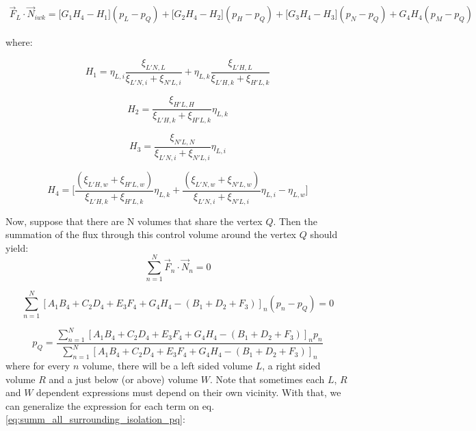\documentclass{article}
\begin{document}
\begin{equation} \label{eq:flux_L_coefficients}
\begin{split}
\vec{F}_{L} \cdot \vec{N}_{iwk} = \Bigg[G_{1}H_{4}-H_{1}\Bigg] (p_{L}-p_{Q})+ \Bigg[G_{2}H_{4}-H_{2}\Bigg](p_{H} - p_{Q})+\Bigg[G_{3}H_{4}-H_{3}\Bigg](p_{N} - p_{Q})+G_{4}H_{4}(p_{M} - p_{Q})
\end{split}
\end{equation}

where:

\begin{displaymath}
H_{1} = \eta_{L,i}\frac{\xi_{L'N,L}}{\xi_{L'N,i}+\xi_{N'L,i}}+\eta_{L,k}\frac{\xi_{L'H,L}}{\xi_{L'H,k}+\xi_{H'L,k}}
\end{displaymath}

\begin{displaymath}
H_{2} = \frac{\xi_{H'L,H}}{\xi_{L'H,k}+\xi_{H'L,k}}\eta_{L,k}
\end{displaymath}

\begin{displaymath}
H_{3} = \frac{\xi_{N'L,N}}{\xi_{L'N,i}+\xi_{N'L,i}}\eta_{L,i}
\end{displaymath}

\begin{displaymath}
H_{4} = \Bigg[\frac{ (\xi_{L'H,w}+\xi_{H'L,w})}{\xi_{L'H,k}+\xi_{H'L,k}}\eta_{L,k}
 +\frac{(\xi_{L'N,w}+\xi_{N'L,w})}{\xi_{L'N,i}+\xi_{N'L,i}}\eta_{L,i} - \eta_{L,w}\Bigg]
\end{displaymath}

Now, suppose that there are N volumes that share the vertex $ Q $. Then the summation of the flux through this control volume around the vertex $ Q $ should yield:
\begin{equation} \label{eq:summ_all_surrounding_Q}
\sum_{n = 1}^{N}\vec{F}_{n} \cdot \vec{N}_{n}=0
\end{equation}

\begin{equation} \label{eq:summ_all_surrounding_Q_coeffic}
\sum_{n=1}^{N}[A_{1}B_{4}+C_{2}D_{4}+E_{3}F_{4}+G_{4}H_{4}-(B_{1}+D_{2}+F_{3})]_{n}(p_{n}-p_{Q})=0
\end{equation}

\begin{equation} \label{eq:summ_all_surrounding_isolation_pq}
p_{Q}=\frac{\sum_{n=1}^{N}[A_{1}B_{4}+C_{2}D_{4}+E_{3}F_{4}+G_{4}H_{4}-(B_{1}+D_{2}+F_{3})]_{n}p_{n}}{\sum_{n=1}^{N}[A_{1}B_{4}+C_{2}D_{4}+E_{3}F_{4}+G_{4}H_{4}-(B_{1}+D_{2}+F_{3})]_{n}}
\end{equation}
where for every $ n $ volume, there will be a left sided volume $ L $, a right sided volume $ R $ and a just below (or above) volume $ W $. Note that sometimes each $ L $, $ R $ and $ W $ dependent expressions must depend on their own vicinity. With that, we can generalize the expression for each term on eq. \ref{eq:summ_all_surrounding_isolation_pq}:
\end{document}
